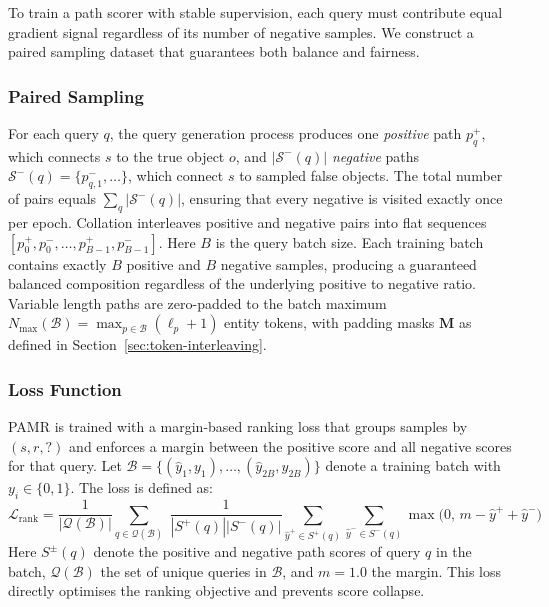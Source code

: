\documentclass[runningheads]{llncs}
\begin{document}
To train a path scorer with stable supervision, each query must contribute equal gradient
signal regardless of its number of negative samples.
We construct a paired sampling
dataset that guarantees both balance and fairness.
\subsubsection{Paired Sampling}
\label{sec:paired-sampling}

For each query $q$, the query generation process produces one
\textit{positive} path $p^+_q$, which connects $s$ to the
true object $o$, and $|\mathcal{S}^-(q)|$ \textit{negative} paths
$\mathcal{S}^-(q) = \{p^-_{q,1}, \ldots\}$, which connect
$s$ to sampled false objects. The total number of pairs equals
$\sum_q |\mathcal{S}^-(q)|$, ensuring that every negative is visited exactly
once per epoch. Collation interleaves positive and negative pairs
into flat sequences
$[p^+_0, p^-_0, \ldots, p^+_{B-1}, p^-_{B-1}]$.
Here $B$ is the query batch size. Each training batch contains
exactly $B$ positive and $B$ negative samples, producing a guaranteed
balanced composition regardless of the underlying positive to negative
ratio. Variable length paths are zero-padded to the batch maximum
$N_{\max}(\mathcal{B}) = \max_{p \in \mathcal{B}} (\ell_p + 1)$
entity tokens, with padding masks $\mathbf{M}$ as defined in
Section~\ref{sec:token-interleaving}.

\subsubsection{Loss Function}
\label{sec:loss-functions}

PAMR is trained with a margin-based ranking loss that groups samples
by $(s, r, ?)$ and enforces a margin between the positive score
and all negative scores for that query. Let $\mathcal{B} = \{(\hat{y}_1, y_1), \ldots, (\hat{y}_{2B}, y_{2B})\}$
denote a training batch with $y_i \in \{0, 1\}$. The loss is defined as:
\begin{equation}
  \mathcal{L}_{\text{rank}} = \frac{1}{|\mathcal{Q}(\mathcal{B})|} \sum_{q \in \mathcal{Q}(\mathcal{B})}\; \frac{1}{|S^+(q)||S^-(q)|} \sum_{\hat{y}^+ \in S^+(q)} \sum_{\hat{y}^- \in S^-(q)}
  \max\bigl(0,\, m - \hat{y}^+ + \hat{y}^-\bigr)
  \label{eq:loss-rank}
\end{equation}
Here $S^{\pm}(q)$ denote the positive and negative path scores of query
$q$ in the batch, $\mathcal{Q}(\mathcal{B})$ the set of unique queries in
$\mathcal{B}$, and $m = 1.0$ the margin. This loss directly optimises the ranking objective and prevents
score collapse.
\end{document}
